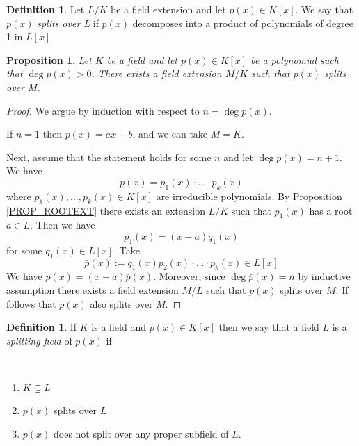 \documentclass[12pt, letterpaper, oneside]{article}
\theoremstyle{plain}
\newtheorem{proposition}[theorem]{Proposition}
\theoremstyle{definition}
\newtheorem{definition}[theorem]{Definition}
\newcommand{\benu}{\begin{enumerate}}
\newcommand{\eenu}{\end{enumerate}}
\newcommand{\vs}{\vskip 5mm}
\newcommand{\isep}[1][0]{\setlength{\itemsep}{#1 mm}}
\begin{document}
\vs\vs


\begin{definition}
Let $L/K$ be a field extension and let $p(x)\in K[x]$. We say that $p(x)$ 
\emph{splits over L} if $p(x)$ decomposes into a product of polynomials 
of degree 1 in $L[x]$
\end{definition}

\vs\vs

\begin{proposition}
\label{PROP_SPLITEXT}
Let $K$ be a field and let $p(x)\in K[x]$ be a polynomial such that 
$\deg p(x) > 0$. There exists a field extension $M/K$ such that 
$p(x)$ splits over $M$. 
\end{proposition}



\begin{proof}

We argue by induction with respect to $n= \deg p(x)$. 

If $n=1$ then $p(x) = ax+b$, and we can take $M=K$. 

Next, assume that  the statement holds for some $n$ and let $\deg p(x) = n+1$. 
We have 
$$p(x) = p_{1}(x)\cdot{\dots}\cdot p_{k}(x)$$
where $p_{1}(x), \dots, p_{k}(x)\in K[x]$ are irreducible polynomials. 
By Proposition \ref{PROP_ROOTEXT} there exists an extension $L/K$ such that 
$p_{1}(x)$ has a root $a\in L$. Then we have 
$$p_{1}(x) = (x-a)q_{1}(x)$$
for some $q_{1}(x)\in L[x]$. Take 
$$\bar{p}(x) := q_{1}(x)p_{2}(x)\cdot {\dots}\cdot p_{k}(x)\in L[x]$$
We have $p(x) = (x-a)\bar{p}(x)$. Moreover, since $\deg{\bar{p}(x)} = n$ by inductive 
assumption there exists a field extension $M/L$ such that $\bar{p}(x)$ splits over $M$. 
If follows that  $p(x)$ also splits over $M$.  
\end{proof}


\vs\vs


\begin{definition}
If $K$ is a field and $p(x)\in K[x]$ then we say that a field $L$ is a 
\emph{splitting field} of $p(x)$ if 

\vskip -13mm

\ 
\benu
\isep[0]
\item $K\subseteq L$
\item $p(x)$ splits over $L$
\item $p(x)$ does not split over any proper subfield of $L$.
\eenu

\end{definition}
\end{document}
